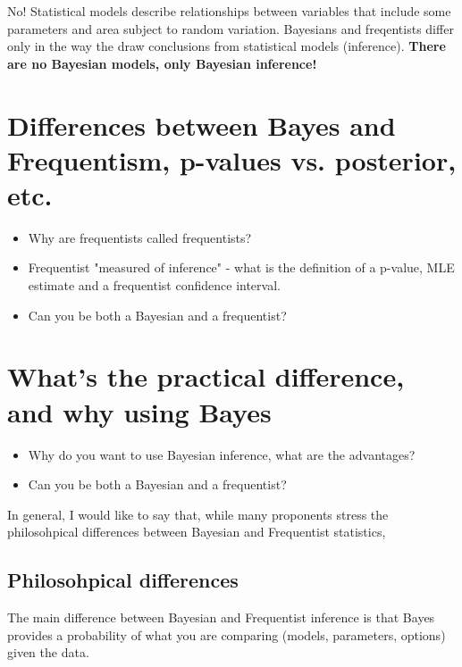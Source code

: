 \documentclass[10pt,a4paper]{article}
\begin{document}
No! Statistical models describe relationships between variables that include some parameters and area subject to random variation. Bayesians and freqentists differ only in the way the draw conclusions from statistical models (inference). \textbf{There are no Bayesian models, only Bayesian inference!}


\section{Differences between Bayes and Frequentism, p-values vs. posterior, etc.}

\begin{mdframed}[frametitle={Ask yourself}]
\begin{itemize}
  \item Why are frequentists called frequentists?
  \item Frequentist "measured of inference" - what is the definition of a p-value, MLE estimate and a frequentist confidence interval. 
  \item Can you be both a Bayesian and a frequentist?
\end{itemize}
\end{mdframed}




\section{What's the practical difference, and why using Bayes}

\begin{mdframed}[frametitle={Ask yourself}]
\begin{itemize}
  \item Why do you want to use Bayesian inference, what are the advantages?
  \item Can you be both a Bayesian and a frequentist?
\end{itemize}
\end{mdframed}

In general, I would like to say that, while many proponents stress the philosohpical differences between Bayesian and Frequentist statistics, 

\subsection{Philosohpical differences}

The main difference between Bayesian and Frequentist inference is that Bayes provides a probability of what you are comparing (models, parameters, options) given the data. 
\end{document}
